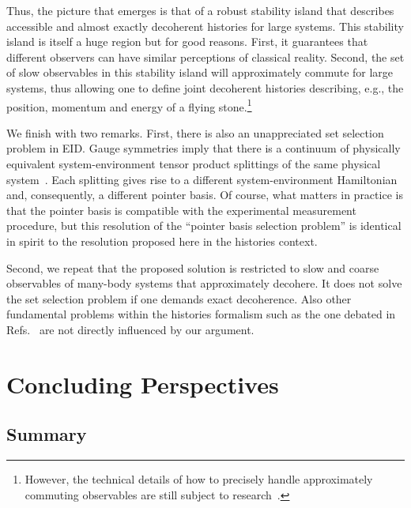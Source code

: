 \documentclass[pre,onecolumn,12pt,aps,longbibliography,nofootinbib]{revtex4-2}
\newcommand{\blue}[1]{#1}
\begin{document}
Thus, the picture that emerges is that of a robust stability island that describes accessible and almost exactly decoherent histories for large systems. This stability island is itself a huge region but for good reasons. First, it guarantees that different observers can have similar perceptions of classical reality. Second, the set of slow observables in this stability island will approximately commute for large systems, thus allowing one to define {joint} decoherent histories describing, e.g., the position, momentum and energy of a flying stone.\footnote{However, the technical details of how to precisely handle approximately commuting observables are still subject to research~\cite{HastingsCMP2009, OgataJFA2013, HalpernEtAlNatComm2016}.}

We finish with two remarks. First, there is also an unappreciated set selection problem in EID. Gauge symmetries imply that there is a continuum of physically equivalent system-environment tensor product splittings of the {same} physical system~\cite{StokesNazirNC2019, StokesNazirRMP2022}. Each splitting gives rise to a different system-environment Hamiltonian and, consequently, a different pointer basis. Of course, what matters in practice is that the pointer basis is compatible with the experimental measurement procedure, but this resolution of the ``pointer basis selection problem'' is identical in spirit to the resolution proposed here in the histories context.

Second, we repeat that the proposed solution is restricted to slow and coarse observables of many-body systems that approximately decohere. It does not solve the set selection problem if one demands {exact} decoherence. Also other fundamental problems within the histories formalism such as the one debated in Refs.~\cite{KentPRL1997, GriffithsHartlePRL1998, KentPRL1998} are not directly influenced by our argument.

\section{Concluding Perspectives}
\label{sec perspectives}

\subsection{\blue{Summary}}
\end{document}
